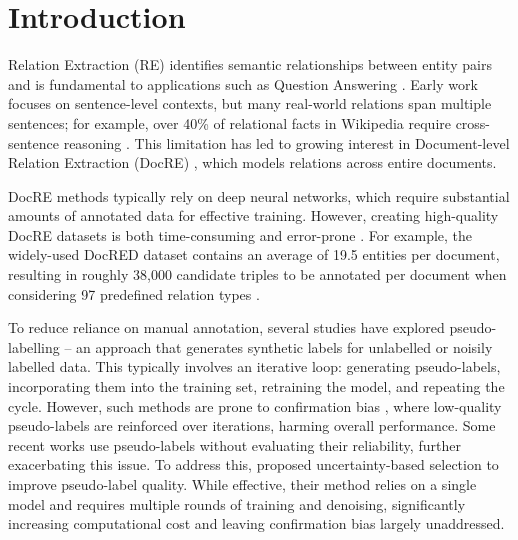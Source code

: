 \section{Introduction}
Relation Extraction (RE) identifies semantic relationships between entity pairs and is fundamental to applications such as Question Answering \cite{xu2016question}. Early work focuses on sentence-level contexts, but many real-world relations span multiple sentences; for example, over 40\% of relational facts in Wikipedia require cross-sentence reasoning \cite{yao2019docred}. This limitation has led to growing interest in Document-level Relation Extraction (DocRE) \cite{xu2021document, zhang2021document, zhou2021document, tan2022document}, which models relations across entire documents.

DocRE methods typically rely on deep neural networks, which require substantial amounts of annotated data for effective training. However, creating high-quality DocRE datasets is both time-consuming and error-prone \cite{tan2022revisiting, huang2022does}. For example, the widely-used DocRED dataset \cite{yao2019docred} contains an average of 19.5 entities per document, resulting in roughly 38,000 candidate triples to be annotated per document when considering 97 predefined relation types \cite{tan2022revisiting}.

To reduce reliance on manual annotation, several studies \cite{tan2023class, feng2024dure, sun2023uncertainty} have explored pseudo-labelling \cite{lee2013pseudo} -- an approach that generates synthetic labels for unlabelled or noisily labelled data. This typically involves an iterative loop: generating pseudo-labels, incorporating them into the training set, retraining the model, and repeating the cycle. However, such methods are prone to confirmation bias \cite{arazo2020pseudo}, where low-quality pseudo-labels are reinforced over iterations, harming overall performance. Some recent works \cite{tan2022document, tan2023class, feng2024dure} use pseudo-labels without evaluating their reliability, further exacerbating this issue. To address this, \citet{sun2023uncertainty} proposed uncertainty-based selection to improve pseudo-label quality. While effective, their method relies on a single model and requires multiple rounds of training and denoising, significantly increasing computational cost and leaving confirmation bias largely unaddressed.

